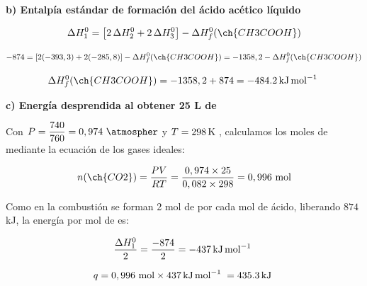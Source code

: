 \begin{exerciseEVAU}
\begin{solu}
        \textbf{b) Entalpía estándar de formación del ácido acético líquido}

        \begin{equation*}
            \Delta H^0_1 = \left[ 2\, \Delta H^0_2 + 2\, \Delta H^0_3 \right] - \Delta H^0_f (\ch{CH3COOH})
        \end{equation*}

        \begin{equation*}
            -874 = \left[ 2(-393,3) + 2(-285,8) \right] - \Delta H^0_f (\ch{CH3COOH}) = -1358,2 - \Delta H^0_f (\ch{CH3COOH})
        \end{equation*}

        \begin{equation*}
            \Delta H^0_f (\ch{CH3COOH}) = -1358,2 + 874 = \energia[kjmol]{-484.2}
        \end{equation*}

        \textbf{c) Energía desprendida al obtener 25 L de }

        Con \(P = \dfrac{740}{760} = 0,974 \ \si{\atmospher}\) y \(T = \temperatura[k]{298}\), calculamos los moles de  mediante la ecuación de los gases ideales:

        \begin{equation*}
            n(\ch{CO2}) = \dfrac{PV}{RT} = \dfrac{0,974 \times 25}{0,082 \times 298} = 0,996 \ \text{mol}
        \end{equation*}

        Como en la combustión se forman 2 mol de  por cada mol de ácido, liberando \(874\) kJ, la energía por mol de  es:

        \begin{equation*}
            \dfrac{\Delta H^0_1}{2} = \dfrac{-874}{2} = \energia[kjmol]{-437}
        \end{equation*}

        \begin{equation*}
            q = 0,996 \ \text{mol} \times \energia[kjmol]{437} = \energia[kj]{435.3}
        \end{equation*}

    \end{solu}
\end{exerciseEVAU}

